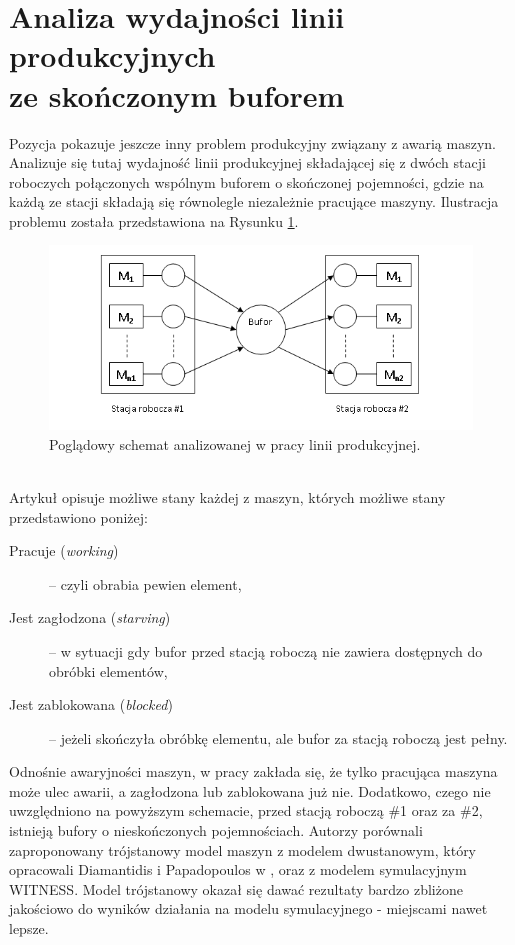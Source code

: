 \documentclass[printmode,oneside]{mgr}
\begin{document}
\section[Analiza wydajności linii produkcyjnych ze skończonym buforem]{Analiza wydajności linii produkcyjnych\\ ze skończonym buforem}
Pozycja \cite{MSTAWFB} pokazuje jeszcze inny problem produkcyjny związany z awarią maszyn. Analizuje się tutaj wydajność linii produkcyjnej składającej się z dwóch stacji roboczych połączonych wspólnym buforem o skończonej pojemności, gdzie na każdą ze stacji składają się równolegle niezależnie pracujące maszyny. Ilustracja problemu została przedstawiona na Rysunku \ref{rys_bufor}.
\begin{figure}[!ht]
\begin{center}
\includegraphics[scale=1.0,width=16cm]{rysunki/bufor.png}
\caption{Poglądowy schemat analizowanej w pracy \cite{MSTAWFB} linii produkcyjnej.}
\label{rys_bufor}
\end{center}
\end{figure}\\
Artykuł opisuje możliwe stany każdej z maszyn, których możliwe stany przedstawiono poniżej:
\begin{description}
    \item[Pracuje (\emph{working})]-- czyli obrabia pewien element,
    \item[Jest zagłodzona (\emph{starving})]-- w sytuacji gdy bufor przed stacją roboczą nie zawiera dostępnych do obróbki elementów,
    \item[Jest zablokowana (\emph{blocked})]-- jeżeli skończyła obróbkę elementu, ale bufor za stacją roboczą jest pełny.
\end{description}
Odnośnie awaryjności maszyn, w pracy zakłada się, że tylko pracująca maszyna może ulec awarii, a zagłodzona lub zablokowana już nie. Dodatkowo, czego nie uwzględniono na powyższym schemacie, przed stacją roboczą \#1 oraz za \#2, istnieją bufory o nieskończonych pojemnościach. Autorzy porównali zaproponowany trójstanowy model maszyn z modelem dwustanowym, który opracowali Diamantidis i Papadopoulos w \cite{Diamantidis2009}, oraz z modelem symulacyjnym WITNESS. Model trójstanowy okazał się dawać rezultaty bardzo zbliżone jakościowo do wyników działania na modelu symulacyjnego - miejscami nawet lepsze.
%
\end{document}
